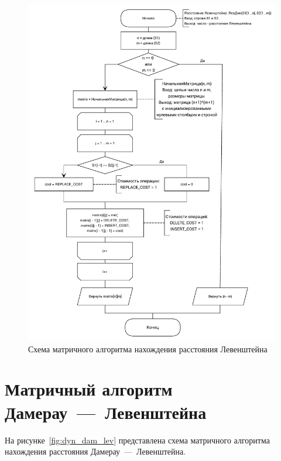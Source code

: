\begin{figure}[H]
\centering
\includegraphics[width=\textwidth]{inc/img/levenshtein_dynamic.pdf}
\caption{Схема матричного алгоритма нахождения расстояния Левенштейна}
\label{fig:dyn_lev}
\end{figure}


\section{Матричный алгоритм Дамерау~---~Левенштейна}

На рисунке~\ref{fig:dyn_dam_lev} представлена схема матричного алгоритма нахождения расстояния Дамерау~---~Левенштейна.

